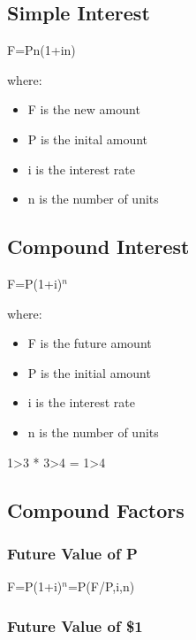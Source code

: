 \documentclass[]{article}
\providecommand{\tightlist}{%
  \setlength{\itemsep}{0pt}\setlength{\parskip}{0pt}}
\begin{document}
\hypertarget{simple-interest}{%
\subsection{Simple Interest}\label{simple-interest}}

F=Pn(1+in)

where:

\begin{itemize}
\tightlist
\item
  F is the new amount
\item
  P is the inital amount
\item
  i is the interest rate
\item
  n is the number of units
\end{itemize}

\hypertarget{compound-interest}{%
\subsection{Compound Interest}\label{compound-interest}}

F=P(1+i)\(^{n}\)

where:

\begin{itemize}
\tightlist
\item
  F is the future amount
\item
  P is the initial amount
\item
  i is the interest rate
\item
  n is the number of units
\end{itemize}

1\textgreater{}3 * 3\textgreater{}4 = 1\textgreater{}4

\hypertarget{compound-factors}{%
\subsection{Compound Factors}\label{compound-factors}}

\hypertarget{future-value-of-p}{%
\subsubsection{Future Value of P}\label{future-value-of-p}}

F=P(1+i)\(^{n}\)=P(F/P,i,n)

\hypertarget{future-value-of-1}{%
\subsubsection{Future Value of \$1}\label{future-value-of-1}}
\end{document}
